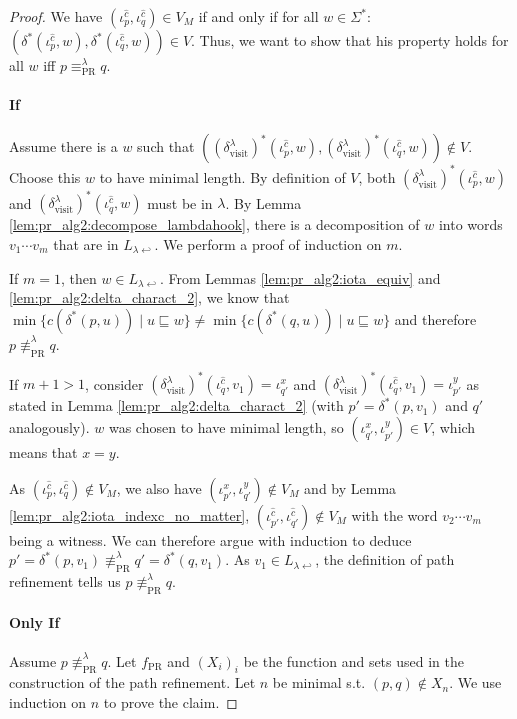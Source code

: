 \begin{proof}
	We have $(\iota_p^{\hat{c}}, \iota_q^{\hat{c}}) \in V_M$ if and only if for all $w \in \Sigma^*$: $(\delta^*(\iota_p^{\hat{c}}, w), \delta^*(\iota_q^{\hat{c}}, w)) \in V$. Thus, we want to show that his property holds for all $w$ iff $p \equiv_\text{PR}^\lambda q$.
	
	\paragraph{If} Assume there is a $w$ such that $((\delta^\lambda_\text{visit})^*(\iota_p^{\hat{c}}, w), (\delta^\lambda_\text{visit})^*(\iota_q^{\hat{c}}, w)) \notin V$. Choose this $w$ to have minimal length. By definition of $V$, both $(\delta^\lambda_\text{visit})^*(\iota_p^{\hat{c}}, w)$ and $(\delta^\lambda_\text{visit})^*(\iota_q^{\hat{c}}, w)$ must be in $\lambda$. By Lemma \ref{lem:pr_alg2:decompose_lambdahook}, there is a decomposition of $w$ into words $v_1 \cdots v_m$ that are in $L_{\lambda \hookleftarrow}$. We perform a proof of induction on $m$.
	
	If $m = 1$, then $w \in L_{\lambda \hookleftarrow}$. From Lemmas \ref{lem:pr_alg2:iota_equiv} and \ref{lem:pr_alg2:delta_charact_2}, we know that $\min \{c(\delta^*(p, u)) \mid u \sqsubseteq w\} \neq \min \{c(\delta^*(q, u)) \mid u \sqsubseteq w\}$ and therefore $p \not\equiv_\text{PR}^\lambda q$.
	
	If $m+1 > 1$, consider $(\delta^\lambda_\text{visit})^*(\iota_q^{\hat{c}}, v_1) = \iota_{q'}^x$ and $(\delta^\lambda_\text{visit})^*(\iota_q^{\hat{c}}, v_1) = \iota_{p'}^y$ as stated in Lemma \ref{lem:pr_alg2:delta_charact_2} (with $p' = \delta^*(p, v_1)$ and $q'$ analogously). $w$ was chosen to have minimal length, so $(\iota_{q'}^x, \iota_{p'}^y) \in V$, which means that $x = y$. 
	
	As $(\iota_p^{\hat{c}}, \iota_q^{\hat{c}}) \notin V_M$, we also have $(\iota_{p'}^x, \iota_{q'}^y) \notin V_M$ and by Lemma \ref{lem:pr_alg2:iota_indexc_no_matter}, $(\iota_{p'}^{\hat{c}}, \iota_{q'}^{\hat{c}}) \notin V_M$ with the word $v_2 \cdots v_m$ being a witness. We can therefore argue with induction to deduce $p' = \delta^*(p, v_1) \not\equiv_\text{PR}^\lambda q' = \delta^*(q, v_1)$. As $v_1 \in L_{\lambda \hookleftarrow}$, the definition of path refinement tells us $p \not\equiv_\text{PR}^\lambda q$.
	
	\paragraph{Only If} Assume $p \not\equiv_\text{PR}^\lambda q$. Let $f_\text{PR}$ and $(X_i)_i$ be the function and sets used in the construction of the path refinement. Let $n$ be minimal s.t. $(p, q) \notin X_n$. We use induction on $n$ to prove the claim.
	

\end{proof}
